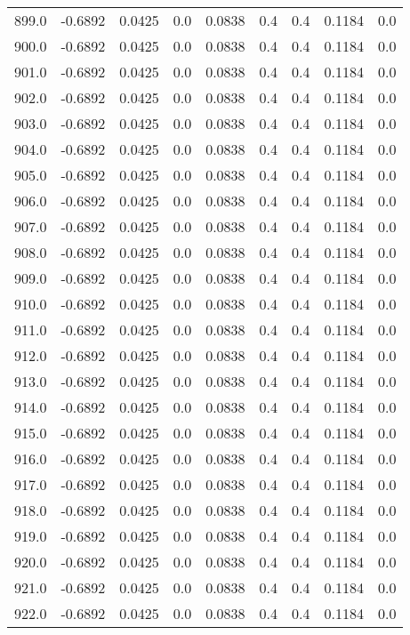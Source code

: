 \begin{longtable}{lrrrrrrrr}
899.0 & -0.6892 & 0.0425 & 0.0 & 0.0838 & 0.4 & 0.4 & 0.1184 & 0.0 \\
900.0 & -0.6892 & 0.0425 & 0.0 & 0.0838 & 0.4 & 0.4 & 0.1184 & 0.0 \\
901.0 & -0.6892 & 0.0425 & 0.0 & 0.0838 & 0.4 & 0.4 & 0.1184 & 0.0 \\
902.0 & -0.6892 & 0.0425 & 0.0 & 0.0838 & 0.4 & 0.4 & 0.1184 & 0.0 \\
903.0 & -0.6892 & 0.0425 & 0.0 & 0.0838 & 0.4 & 0.4 & 0.1184 & 0.0 \\
904.0 & -0.6892 & 0.0425 & 0.0 & 0.0838 & 0.4 & 0.4 & 0.1184 & 0.0 \\
905.0 & -0.6892 & 0.0425 & 0.0 & 0.0838 & 0.4 & 0.4 & 0.1184 & 0.0 \\
906.0 & -0.6892 & 0.0425 & 0.0 & 0.0838 & 0.4 & 0.4 & 0.1184 & 0.0 \\
907.0 & -0.6892 & 0.0425 & 0.0 & 0.0838 & 0.4 & 0.4 & 0.1184 & 0.0 \\
908.0 & -0.6892 & 0.0425 & 0.0 & 0.0838 & 0.4 & 0.4 & 0.1184 & 0.0 \\
909.0 & -0.6892 & 0.0425 & 0.0 & 0.0838 & 0.4 & 0.4 & 0.1184 & 0.0 \\
910.0 & -0.6892 & 0.0425 & 0.0 & 0.0838 & 0.4 & 0.4 & 0.1184 & 0.0 \\
911.0 & -0.6892 & 0.0425 & 0.0 & 0.0838 & 0.4 & 0.4 & 0.1184 & 0.0 \\
912.0 & -0.6892 & 0.0425 & 0.0 & 0.0838 & 0.4 & 0.4 & 0.1184 & 0.0 \\
913.0 & -0.6892 & 0.0425 & 0.0 & 0.0838 & 0.4 & 0.4 & 0.1184 & 0.0 \\
914.0 & -0.6892 & 0.0425 & 0.0 & 0.0838 & 0.4 & 0.4 & 0.1184 & 0.0 \\
915.0 & -0.6892 & 0.0425 & 0.0 & 0.0838 & 0.4 & 0.4 & 0.1184 & 0.0 \\
916.0 & -0.6892 & 0.0425 & 0.0 & 0.0838 & 0.4 & 0.4 & 0.1184 & 0.0 \\
917.0 & -0.6892 & 0.0425 & 0.0 & 0.0838 & 0.4 & 0.4 & 0.1184 & 0.0 \\
918.0 & -0.6892 & 0.0425 & 0.0 & 0.0838 & 0.4 & 0.4 & 0.1184 & 0.0 \\
919.0 & -0.6892 & 0.0425 & 0.0 & 0.0838 & 0.4 & 0.4 & 0.1184 & 0.0 \\
920.0 & -0.6892 & 0.0425 & 0.0 & 0.0838 & 0.4 & 0.4 & 0.1184 & 0.0 \\
921.0 & -0.6892 & 0.0425 & 0.0 & 0.0838 & 0.4 & 0.4 & 0.1184 & 0.0 \\
922.0 & -0.6892 & 0.0425 & 0.0 & 0.0838 & 0.4 & 0.4 & 0.1184 & 0.0 \\

\end{longtable}
